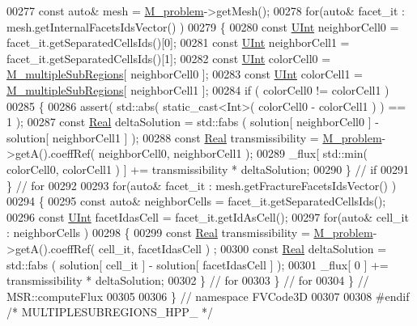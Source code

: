 \begin{DoxyCode}
00277     \textcolor{keyword}{const} \textcolor{keyword}{auto}& mesh = \hyperlink{classFVCode3D_1_1MSR_a531760a5415f63b7be6087ab117031e5}{M\_problem}->getMesh();
00278     \textcolor{keywordflow}{for}(\textcolor{keyword}{auto}& facet\_it : mesh.getInternalFacetsIdsVector() )
00279     \{
00280         \textcolor{keyword}{const} \hyperlink{namespaceFVCode3D_a4bf7e328c75d0fd504050d040ebe9eda}{UInt} neighborCell0 = facet\_it.getSeparatedCellsIds()[0];
00281         \textcolor{keyword}{const} \hyperlink{namespaceFVCode3D_a4bf7e328c75d0fd504050d040ebe9eda}{UInt} neighborCell1 = facet\_it.getSeparatedCellsIds()[1];
00282         \textcolor{keyword}{const} \hyperlink{namespaceFVCode3D_a4bf7e328c75d0fd504050d040ebe9eda}{UInt} colorCell0 = \hyperlink{classFVCode3D_1_1MSR_a38cba0138e4ebd055d47b3d9d9d32623}{M\_multipleSubRegions}[ neighborCell0 ];
00283         \textcolor{keyword}{const} \hyperlink{namespaceFVCode3D_a4bf7e328c75d0fd504050d040ebe9eda}{UInt} colorCell1 = \hyperlink{classFVCode3D_1_1MSR_a38cba0138e4ebd055d47b3d9d9d32623}{M\_multipleSubRegions}[ neighborCell1 ];
00284         \textcolor{keywordflow}{if} ( colorCell0 != colorCell1 )
00285         \{
00286             assert( std::abs( static\_cast<Int>( colorCell0 - colorCell1 ) ) == 1 );
00287             \textcolor{keyword}{const} \hyperlink{namespaceFVCode3D_a40c1f5588a248569d80aa5f867080e83}{Real} deltaSolution = std::fabs ( solution[ neighborCell0 ] - solution[ neighborCell1 
      ] );
00288             \textcolor{keyword}{const} \hyperlink{namespaceFVCode3D_a40c1f5588a248569d80aa5f867080e83}{Real} transmissibility = \hyperlink{classFVCode3D_1_1MSR_a531760a5415f63b7be6087ab117031e5}{M\_problem}->getA().coeffRef( neighborCell0, 
      neighborCell1 );
00289             \_flux[ std::min( colorCell0, colorCell1 ) ] += transmissibility * deltaSolution;
00290         \} \textcolor{comment}{// if}
00291     \} \textcolor{comment}{// for}
00292 
00293     \textcolor{keywordflow}{for}(\textcolor{keyword}{auto}& facet\_it : mesh.getFractureFacetsIdsVector() )
00294     \{
00295         \textcolor{keyword}{const} \textcolor{keyword}{auto}& neighborCells = facet\_it.getSeparatedCellsIds();
00296         \textcolor{keyword}{const} \hyperlink{namespaceFVCode3D_a4bf7e328c75d0fd504050d040ebe9eda}{UInt} facetIdasCell = facet\_it.getIdAsCell();
00297         \textcolor{keywordflow}{for}(\textcolor{keyword}{auto}& cell\_it : neighborCells )
00298         \{
00299             \textcolor{keyword}{const} \hyperlink{namespaceFVCode3D_a40c1f5588a248569d80aa5f867080e83}{Real} transmissibility = \hyperlink{classFVCode3D_1_1MSR_a531760a5415f63b7be6087ab117031e5}{M\_problem}->getA().coeffRef( cell\_it, facetIdasCell )
      ;
00300             \textcolor{keyword}{const} \hyperlink{namespaceFVCode3D_a40c1f5588a248569d80aa5f867080e83}{Real} deltaSolution = std::fabs ( solution[ cell\_it ] - solution[ facetIdasCell ] );
00301             \_flux[ 0 ] += transmissibility * deltaSolution;
00302         \} \textcolor{comment}{// for}
00303     \} \textcolor{comment}{// for}
00304 \} \textcolor{comment}{// MSR::computeFlux}
00305 
00306 \} \textcolor{comment}{// namespace FVCode3D}
00307 
00308 \textcolor{preprocessor}{#endif }\textcolor{comment}{/* MULTIPLESUBREGIONS\_HPP\_ */}\textcolor{preprocessor}{}
\end{DoxyCode}
